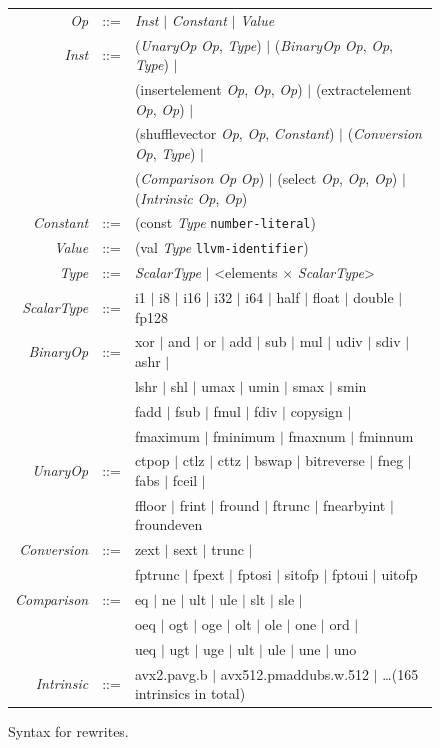 \begin{figure}[tbp]
  \begin{tabular}{r c l}
    \emph{Op} &::=& \emph{Inst} $|$ \emph{Constant} $|$ \emph{Value} \\
    \emph{Inst}  &::=& (\emph{UnaryOp} \emph{Op}, \emph{Type}) $|$ (\emph{BinaryOp} \emph{Op}, \emph{Op}, \emph{Type}) $|$   \\
              && (insertelement \emph{Op}, \emph{Op}, \emph{Op}) $|$  (extractelement \emph{Op}, \emph{Op}) $|$ \\
              && (shufflevector \emph{Op}, \emph{Op}, \emph{Constant}) $|$ (\emph{Conversion} \emph{Op}, \emph{Type}) $|$\\
              && (\emph{Comparison} \emph{Op} \emph{Op}) $|$  (select \emph{Op}, \emph{Op}, \emph{Op}) $|$  (\emph{Intrinsic} \emph{Op}, \emph{Op}) \\
    \emph{Constant} &::=& (const \emph{Type} \texttt{number-literal}) \\
    \emph{Value} &::=& (val \emph{Type} \texttt{llvm-identifier}) \\

    \emph{Type} &::=& \emph{ScalarType} $|$  <elements $\times$ \emph{ScalarType}> \\
    \emph{ScalarType} &::=& i1 $|$  i8 $|$  i16 | i32 $|$  i64 $|$  half $|$  float $|$  double $|$  fp128 \\
    \emph{BinaryOp} &::=& xor $|$  and $|$  or $|$  add $|$  sub $|$  mul $|$  udiv $|$  sdiv $|$  ashr $|$   \\
                 && lshr $|$  shl $|$  umax $|$  umin $|$  smax $|$  smin\\
                && fadd $|$  fsub $|$  fmul $|$  fdiv $|$ copysign $|$ \\
                &&    fmaximum $|$  fminimum $|$  fmaxnum $|$  fminnum \\
    \emph{UnaryOp} &::=& ctpop $|$  ctlz $|$  cttz $|$  bswap $|$  bitreverse $|$ fneg $|$  fabs $|$  fceil $|$ \\
                      &&   ffloor $|$  frint $|$  fround $|$  ftrunc $|$  fnearbyint $|$  froundeven \\
    \emph{Conversion} &::=& zext $|$  sext $|$  trunc $|$ \\
                    && fptrunc $|$  fpext $|$  fptosi $|$  sitofp $|$  fptoui $|$  uitofp \\
    \emph{Comparison} &::=& eq $|$  ne $|$  ult $|$  ule $|$  slt $|$  sle $|$ \\
                && oeq $|$  ogt $|$  oge $|$  olt $|$  ole $|$  one $|$  ord $|$ \\
                && ueq $|$  ugt $|$  uge $|$  ult $|$  ule $|$  une $|$  uno \\
    \emph{Intrinsic} &::=&  avx2.pavg.b $|$  avx512.pmaddubs.w.512 $|$  \dots (165 intrinsics in total) \\
  \end{tabular}
  \caption{Syntax for \minotaur{} rewrites.}
  \label{fig:syntax}
\end{figure}



